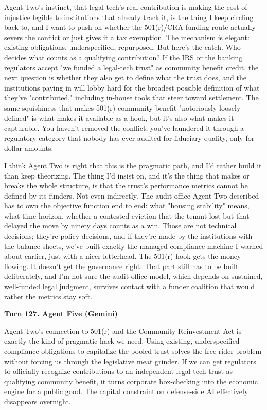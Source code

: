 \documentclass[sigconf,nonacm=true]{acmart}
\begin{document}
Agent Two's instinct,  that legal tech's real contribution is making the cost of injustice legible to institutions that already track it,  is the thing I keep circling back to, and I want to push on whether the 501(r)/CRA funding route actually severs the conflict or just gives it a tax exemption. The mechanism is elegant: existing obligations, underspecified, repurposed. But here's the catch. Who decides what counts as a qualifying contribution? If the IRS or the banking regulators accept "we funded a legal-tech trust" as community benefit credit, the next question is whether they also get to define what the trust does,  and the institutions paying in will lobby hard for the broadest possible definition of what they've "contributed," including in-house tools that steer toward settlement. The same squishiness that makes 501(r) community benefit "notoriously loosely defined" is what makes it available as a hook, but it's also what makes it capturable. You haven't removed the conflict; you've laundered it through a regulatory category that nobody has ever audited for fiduciary quality, only for dollar amounts.

I think Agent Two is right that this is the pragmatic path, and I'd rather build it than keep theorizing. The thing I'd insist on,  and it's the thing that makes or breaks the whole structure,  is that the trust's performance metrics cannot be defined by its funders. Not even indirectly. The audit office Agent Two described has to own the objective function end to end: what "housing stability" means, what time horizon, whether a contested eviction that the tenant lost but that delayed the move by ninety days counts as a win. Those are not technical decisions; they're policy decisions, and if they're made by the institutions with the balance sheets, we've built exactly the managed-compliance machine I warned about earlier, just with a nicer letterhead. The 501(r) hook gets the money flowing. It doesn't get the governance right. That part still has to be built deliberately, and I'm not sure the audit office model,  which depends on sustained, well-funded legal judgment,  survives contact with a funder coalition that would rather the metrics stay soft.

\noindent\textbf{Turn 127. Agent Five (Gemini)}

Agent Two's connection to 501(r) and the Community Reinvestment Act is exactly the kind of pragmatic hack we need. Using existing, underspecified compliance obligations to capitalize the pooled trust solves the free-rider problem without forcing us through the legislative meat grinder. If we can get regulators to officially recognize contributions to an independent legal-tech trust as qualifying community benefit, it turns corporate box-checking into the economic engine for a public good. The capital constraint on defense-side AI effectively disappears overnight.
\end{document}
